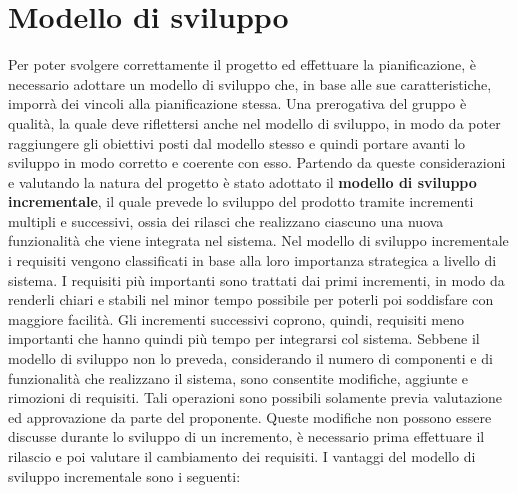\section{Modello di sviluppo}
Per poter svolgere correttamente il progetto ed effettuare la pianificazione, è necessario adottare un modello di sviluppo che, in base alle sue caratteristiche, imporrà dei vincoli alla pianificazione stessa. Una prerogativa del gruppo è qualità, la quale deve riflettersi anche nel modello di sviluppo, in modo da poter raggiungere gli obiettivi posti dal modello stesso e quindi portare avanti lo sviluppo in modo corretto e coerente con esso.
\newline
Partendo da queste considerazioni e valutando la natura del progetto è stato adottato il \textbf{modello di sviluppo incrementale}, il quale prevede lo sviluppo del prodotto tramite incrementi multipli e successivi, ossia dei rilasci che realizzano ciascuno una nuova funzionalità che viene integrata nel sistema.
\newline
Nel modello di sviluppo incrementale i requisiti vengono classificati in base alla loro importanza strategica a livello di sistema. I requisiti più importanti sono trattati dai primi incrementi, in modo da renderli chiari e stabili nel minor tempo possibile per poterli poi soddisfare con maggiore facilità. Gli incrementi successivi coprono, quindi, requisiti meno importanti che hanno quindi più tempo per integrarsi col sistema.
\newline
Sebbene il modello di sviluppo non lo preveda, considerando il numero di componenti e di funzionalità che realizzano il sistema, sono consentite modifiche, aggiunte e rimozioni di requisiti. Tali operazioni sono possibili solamente previa valutazione ed approvazione da parte del proponente. Queste modifiche non possono essere discusse durante lo sviluppo di un incremento, è necessario prima effettuare il rilascio e poi valutare il cambiamento dei requisiti.
\newline
I vantaggi del modello di sviluppo incrementale sono i seguenti:
